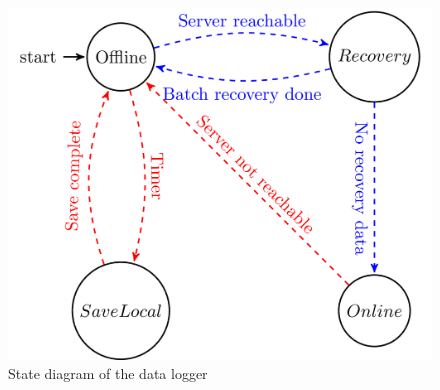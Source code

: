 \begin{figure} 
	\centering
	\includegraphics[width=1\linewidth]{tikz/statLogger}
	\caption[State diagram of the data logger]{State diagram of the data logger}
	\label{fig:statLogger}
\end{figure}
